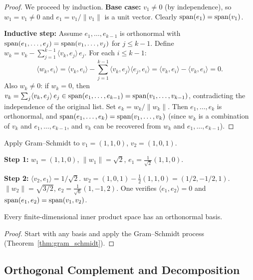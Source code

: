 \documentclass[11pt,a4paper]{article}
\begin{document}
\begin{proof}
We proceed by induction.  \textbf{Base case:} $v_1 \neq 0$ (by
independence), so $w_1 = v_1 \neq 0$ and $e_1 = v_1/\|v_1\|$ is a
unit vector.  Clearly $\operatorname{span}(e_1) = \operatorname{span}(v_1)$.

\textbf{Inductive step:} Assume $e_1, \ldots, e_{k-1}$ is orthonormal
with $\operatorname{span}(e_1, \ldots, e_{j}) = \operatorname{span}(v_1, \ldots, v_j)$ for
$j \leq k-1$.  Define
$w_k = v_k - \sum_{j=1}^{k-1} \langle v_k, e_j \rangle\, e_j$.
For each $i \leq k-1$:
\[
  \langle w_k, e_i \rangle
  = \langle v_k, e_i \rangle
    - \sum_{j=1}^{k-1} \langle v_k, e_j \rangle \langle e_j, e_i \rangle
  = \langle v_k, e_i \rangle - \langle v_k, e_i \rangle = 0.
\]
Also $w_k \neq 0$: if $w_k = 0$, then
$v_k = \sum_j \langle v_k, e_j \rangle\, e_j \in \operatorname{span}(e_1, \ldots, e_{k-1})
= \operatorname{span}(v_1, \ldots, v_{k-1})$, contradicting the independence of the
original list.  Set $e_k = w_k / \|w_k\|$.  Then $e_1, \ldots, e_k$ is
orthonormal, and $\operatorname{span}(e_1, \ldots, e_k) = \operatorname{span}(v_1, \ldots, v_k)$
(since $w_k$ is a combination of $v_k$ and $e_1, \ldots, e_{k-1}$, and
$v_k$ can be recovered from $w_k$ and $e_1, \ldots, e_{k-1}$).
\end{proof}

\begin{example}
\label{ex:gram_schmidt_R3}
Apply Gram--Schmidt to $v_1 = (1, 1, 0)$, $v_2 = (1, 0, 1)$.

\textbf{Step 1:} $w_1 = (1,1,0)$, $\|w_1\| = \sqrt{2}$,
$e_1 = \frac{1}{\sqrt{2}}(1, 1, 0)$.

\textbf{Step 2:} $\langle v_2, e_1 \rangle = 1/\sqrt{2}$.
$w_2 = (1,0,1) - \frac{1}{2}(1,1,0) = (1/2, -1/2, 1)$.
$\|w_2\| = \sqrt{3/2}$,
$e_2 = \frac{1}{\sqrt{6}}(1, -1, 2)$.
One verifies $\langle e_1, e_2 \rangle = 0$ and
$\operatorname{span}(e_1, e_2) = \operatorname{span}(v_1, v_2)$.
\end{example}

\begin{corollary}
\label{cor:onb_exists}
Every finite-dimensional inner product space has an orthonormal basis.
\end{corollary}

\begin{proof}
Start with any basis and apply the Gram--Schmidt process
(Theorem~\ref{thm:gram_schmidt}).
\end{proof}

\subsection{Orthogonal Complement and Decomposition}
\end{document}
